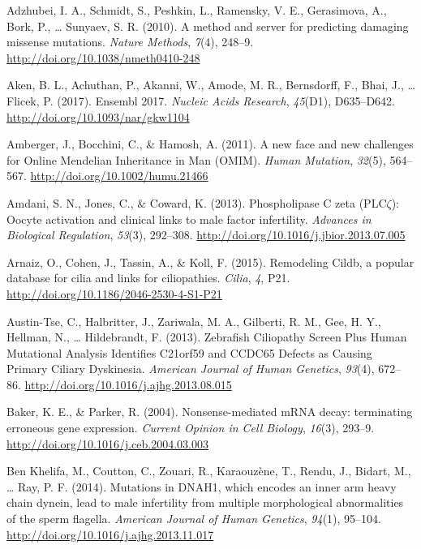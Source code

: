 \documentclass[12pt,twoside]{reedthesis}
\theoremstyle{definition}
\theoremstyle{definition}
\theoremstyle{remark}
\begin{document}
  \hypertarget{ref-Adzhubei2010}{}
  Adzhubei, I. A., Schmidt, S., Peshkin, L., Ramensky, V. E., Gerasimova,
  A., Bork, P., \ldots{} Sunyaev, S. R. (2010). A method and server for
  predicting damaging missense mutations. \emph{Nature Methods},
  \emph{7}(4), 248--9. \url{http://doi.org/10.1038/nmeth0410-248}
  
  \hypertarget{ref-Aken2017}{}
  Aken, B. L., Achuthan, P., Akanni, W., Amode, M. R., Bernsdorff, F.,
  Bhai, J., \ldots{} Flicek, P. (2017). Ensembl 2017. \emph{Nucleic Acids
  Research}, \emph{45}(D1), D635--D642.
  \url{http://doi.org/10.1093/nar/gkw1104}
  
  \hypertarget{ref-Amberger2011}{}
  Amberger, J., Bocchini, C., \& Hamosh, A. (2011). A new face and new
  challenges for Online Mendelian Inheritance in Man (OMIM). \emph{Human
  Mutation}, \emph{32}(5), 564--567.
  \url{http://doi.org/10.1002/humu.21466}
  
  \hypertarget{ref-Amdani2013}{}
  Amdani, S. N., Jones, C., \& Coward, K. (2013). Phospholipase C zeta
  (PLC\(\zeta\)): Oocyte activation and clinical links to male factor
  infertility. \emph{Advances in Biological Regulation}, \emph{53}(3),
  292--308. \url{http://doi.org/10.1016/j.jbior.2013.07.005}
  
  \hypertarget{ref-Arnaiz2015}{}
  Arnaiz, O., Cohen, J., Tassin, A., \& Koll, F. (2015). Remodeling Cildb,
  a popular database for cilia and links for ciliopathies. \emph{Cilia},
  \emph{4}, P21. \url{http://doi.org/10.1186/2046-2530-4-S1-P21}
  
  \hypertarget{ref-Austin-Tse2013}{}
  Austin-Tse, C., Halbritter, J., Zariwala, M. A., Gilberti, R. M., Gee,
  H. Y., Hellman, N., \ldots{} Hildebrandt, F. (2013). Zebrafish
  Ciliopathy Screen Plus Human Mutational Analysis Identifies C21orf59 and
  CCDC65 Defects as Causing Primary Ciliary Dyskinesia. \emph{American
  Journal of Human Genetics}, \emph{93}(4), 672--86.
  \url{http://doi.org/10.1016/j.ajhg.2013.08.015}
  
  \hypertarget{ref-Baker2004}{}
  Baker, K. E., \& Parker, R. (2004). Nonsense-mediated mRNA decay:
  terminating erroneous gene expression. \emph{Current Opinion in Cell
  Biology}, \emph{16}(3), 293--9.
  \url{http://doi.org/10.1016/j.ceb.2004.03.003}
  
  \hypertarget{ref-BenKhelifa2014}{}
  Ben Khelifa, M., Coutton, C., Zouari, R., Karaouzène, T., Rendu, J.,
  Bidart, M., \ldots{} Ray, P. F. (2014). Mutations in DNAH1, which
  encodes an inner arm heavy chain dynein, lead to male infertility from
  multiple morphological abnormalities of the sperm flagella.
  \emph{American Journal of Human Genetics}, \emph{94}(1), 95--104.
  \url{http://doi.org/10.1016/j.ajhg.2013.11.017}
  
\end{document}
